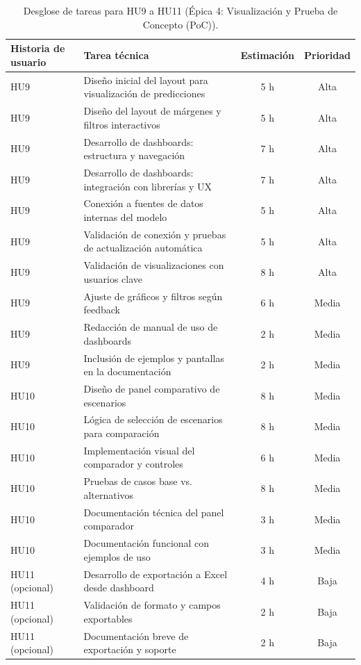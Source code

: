 \documentclass[
11pt, %
]{charter}
\begin{document}
\begin{table}[H]
\centering
\begin{tabular}{|l|p{6cm}|c|c|}
\hline
\textbf{Historia de usuario} & \textbf{Tarea técnica} & \textbf{Estimación} & \textbf{Prioridad} \\
\hline
HU9 & Diseño inicial del layout para visualización de predicciones & 5 h & Alta \\
HU9 & Diseño del layout de márgenes y filtros interactivos & 5 h & Alta \\
HU9 & Desarrollo de dashboards: estructura y navegación & 7 h & Alta \\
HU9 & Desarrollo de dashboards: integración con librerías y UX & 7 h & Alta \\
HU9 & Conexión a fuentes de datos internas del modelo & 5 h & Alta \\
HU9 & Validación de conexión y pruebas de actualización automática & 5 h & Alta \\
HU9 & Validación de visualizaciones con usuarios clave & 8 h & Alta \\
HU9 & Ajuste de gráficos y filtros según feedback & 6 h & Media \\
HU9 & Redacción de manual de uso de dashboards & 2 h & Media \\
HU9 & Inclusión de ejemplos y pantallas en la documentación & 2 h & Media \\
\hline
HU10 & Diseño de panel comparativo de escenarios & 8 h & Media \\
HU10 & Lógica de selección de escenarios para comparación & 8 h & Media \\
HU10 & Implementación visual del comparador y controles & 6 h & Media \\
HU10 & Pruebas de casos base vs. alternativos & 8 h & Media \\
HU10 & Documentación técnica del panel comparador & 3 h & Media \\
HU10 & Documentación funcional con ejemplos de uso & 3 h & Media \\
\hline
HU11 (opcional) & Desarrollo de exportación a Excel desde dashboard & 4 h & Baja \\
HU11 (opcional) & Validación de formato y campos exportables & 2 h & Baja \\
HU11 (opcional) & Documentación breve de exportación y soporte & 2 h & Baja \\
\hline
\end{tabular}
\caption{Desglose de tareas para HU9 a HU11 (Épica 4: Visualización y Prueba de Concepto (PoC)).}
\end{table}
\end{document}
